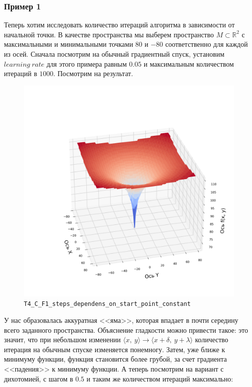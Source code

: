 \documentclass[12pt, a4paper, oneside, final]{article}
\begin{document}
	\subsubsection*{Пример 1}
	Теперь хотим исследовать количество итераций алгоритма в зависимости от начальной точки. В качестве пространства мы выберем пространство $M \subset \mathbb{R}^{2}$ с максимальными и минимальными точками $80$ и $-80$ соответственно для каждой из осей. Сначала посмотрим на обычный градиентный спуск, установим $learning~rate$ для этого примера равным $0.05$ и максимальным количеством итераций в $1000$. Посмотрим на результат.
	\begin{figure}[H]
		\centering
		\includegraphics[scale=0.68]{Image/T4_C_F1_steps_dependens_on_start_point_constant.png}
		\caption*{\texttt{T4\_C\_F1\_steps\_dependens\_on\_start\_point\_constant}}
	\end{figure}
	У нас образовалась аккуратная <<яма>>, которая впадает в почти середину всего заданного пространства. Объяснение гладкости можно привести такое: это значит, что при небольшом изменении $\langle x, ~ y\rangle \to \langle x + \delta, ~ y + \lambda \rangle$ количество итерация на обычным спуске изменяется понемногу. Затем, уже ближе к минимуму функции, функция становится более грубой, за счет градиента <<падения>> к минимуму функции. А теперь посмотрим на вариант с дихотомией, с шагом в $0.5$ и таким же количеством итераций максимально:
\end{document}

